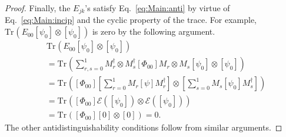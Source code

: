 \documentclass[DIV=calc,paper=a4,fontsize=11pt,twocolumn]{scrartcl} %
\theoremstyle{definition}
\theoremstyle{plain}
\newcommand{\Proj}[1]{\ensuremath{\left [ #1 \right ]}}
\newcommand{\Tr}[2][]{\ensuremath{\text{Tr}_{#1} \left ( #2 \right )}}
\begin{document}
\begin{proof}
Finally, the $E_{jk}$'s satisfy Eq.~\eqref{eq:Main:anti} by virtue
of Eq.~\eqref{eq:Main:incip} and the cyclic property of the trace.
For example, $\Tr{E_{00} \Proj{\psi_0} \otimes \Proj{\psi_0}}$ is zero by
the following argument.
\begin{align}
&\Tr{E_{00} \Proj{\psi_0} \otimes \Proj{\psi_0}} \nonumber\\
& = \Tr{\sum_{r,s
= 0}^1 M_r^{\dagger} \otimes M_s^{\dagger} \Proj{\Phi_{00}}
M_r \otimes
M_s \Proj{\psi_0} \otimes \Proj{\psi_0}} \\
& = \Tr{\Proj{\Phi_{00}} \left [ \sum_{r=0}^1 M_r \Proj{\psi}
M_r^{\dagger} \right ] \otimes \left [ \sum_{s=0}^1 M_s
\Proj{\psi_0} M_s^{\dagger} \right ]} \\
& = \Tr{\Proj{\Phi_{00}} \mathcal{E}(\Proj{\psi_0}) \otimes
\mathcal{E}(\Proj{\psi_0})} \\
& = \Tr{\Proj{\Phi_{00}} \Proj{0} \otimes \Proj{0}} = 0.
\end{align}
The other antidistinguishability conditions follow from similar
arguments.
\end{proof}
\end{document}
